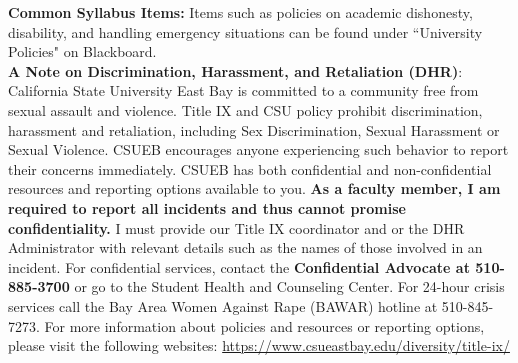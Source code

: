 \documentclass[12pt]{report}
\begin{document}
\textbf{Common Syllabus Items:}  Items such as policies on academic dishonesty, disability, and handling emergency situations can be found under ``University Policies" on Blackboard.\\

\textbf{A Note on Discrimination, Harassment, and Retaliation (DHR)}:\\
California State University East Bay is committed to a community free from sexual assault and violence. Title IX and CSU policy prohibit discrimination, harassment and retaliation, including Sex Discrimination, Sexual Harassment or Sexual Violence. CSUEB encourages anyone experiencing such behavior to report their concerns immediately. CSUEB has both confidential and non-confidential resources and reporting options available to you. \textbf{As a faculty member, I am required to report all incidents and thus cannot promise confidentiality.} I must provide our Title IX coordinator and or the DHR Administrator with relevant details such as the names of those involved in an incident. For confidential services, contact the \textbf{Confidential Advocate at 510-885-3700} or go to the Student Health and Counseling Center. For 24-hour crisis services call the Bay Area Women Against Rape (BAWAR) hotline at 510-845-7273. For more information about policies and resources or reporting options, please visit the following websites: \url{https://www.csueastbay.edu/diversity/title-ix/}
\end{document}
